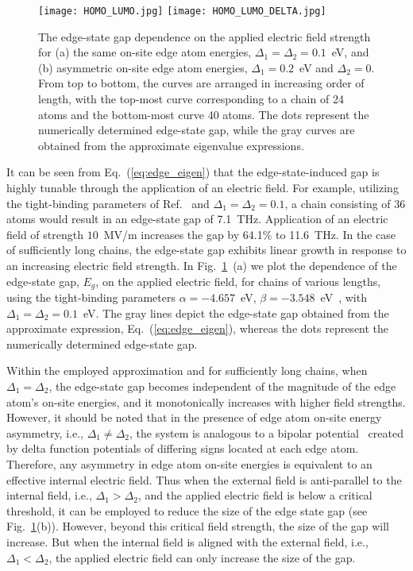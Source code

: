 \documentclass[
preprint,
 amsmath,amssymb,
 aps,
]{revtex4-2}
\begin{document}
\begin{figure}
\texttt{[image: HOMO\_LUMO.jpg]}
\texttt{[image: HOMO\_LUMO\_DELTA.jpg]}
    \caption{The edge-state gap dependence on the applied electric field strength for (a) the same on-site edge atom energies, $\Delta_1=\Delta_2=0.1$~eV, and (b) asymmetric on-site edge atom energies, $\Delta_1=0.2$~eV and $\Delta_2=0$. From top to bottom, the curves are arranged in increasing order of length, with the top-most curve corresponding to a chain of 24 atoms and the bottom-most curve 40 atoms. The dots represent the numerically determined edge-state gap, while the gray curves are obtained from the approximate eigenvalue expressions.
}
    \label{fig:HL_Gap}
\end{figure}

It can be seen from Eq.~(\ref{eq:edge_eigen}) that the edge-state-induced gap is highly tunable through the application of an electric field. For example, utilizing the tight-binding parameters of Ref.~\cite{al2014electronic} and $\Delta_1=\Delta_2=0.1$, a chain consisting of 36 atoms would result in an %
edge-state gap of 7.1~THz. Application of an electric field of strength $10$~MV/m increases the gap by 64.1\% to 11.6~THz. In the case of sufficiently long chains, the edge-state gap exhibits linear growth in response to an increasing electric field strength. In Fig.~\ref{fig:HL_Gap}~(a) we plot the dependence of the edge-state gap, $E_g$, on the applied electric field, for chains of various lengths, using the tight-binding parameters $\alpha=-4.657$~eV, $\beta=-3.548$~eV~\cite{al2014electronic}, with $\Delta_1=\Delta_2=0.1$~eV. The gray lines depict the edge-state gap obtained from the approximate expression, Eq.~(\ref{eq:edge_eigen}), whereas the dots represent the numerically determined edge-state gap.

Within the employed approximation and for sufficiently long chains, when $\Delta_{1}=\Delta_{2}$, the edge-state gap becomes independent of the magnitude of the edge atom's on-site energies, and it monotonically increases with higher field strengths. However, it should be noted that in the presence of edge atom on-site energy asymmetry, i.e., $\Delta_{1}\neq\Delta_{2}$, the system is analogous to a bipolar potential~\cite{hartmann2020bipolar} created by delta function potentials of differing signs located at each edge atom. Therefore, any asymmetry in edge atom on-site energies is equivalent to an effective internal electric field. Thus when the external field is anti-parallel to the internal field, i.e., $\Delta_{1}>\Delta_{2}$, and the applied electric field is below a critical threshold, it can be employed to reduce the size of the edge state gap (see Fig.~\ref{fig:HL_Gap}(b)). However, beyond this critical field strength, the size of the gap will increase. But when the internal field is aligned with the external field, i.e., $\Delta_{1}<\Delta_{2}$, the applied electric field can only increase the size of the gap.
\end{document}
